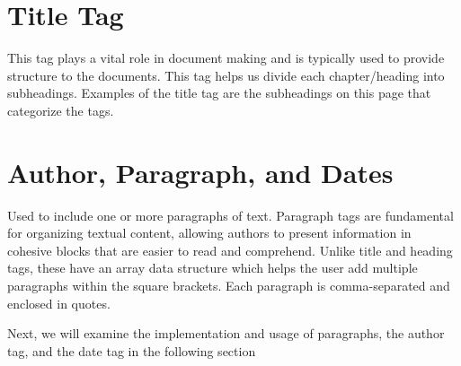 \documentclass[oneside]{book}
\begin{document}
\section{Title Tag}
This tag plays a vital role in document making and is typically used to provide structure to the documents. This tag helps us divide each chapter/heading into subheadings.
        Examples of the title tag are the subheadings on this page that categorize the tags.\par
\section{Author, Paragraph, and Dates}
Used to include one or more paragraphs of text. Paragraph tags are fundamental for organizing textual content, allowing authors to present
        information in cohesive blocks that are easier to read and comprehend. Unlike title and heading tags, these have an array data structure which helps the user add multiple 
        paragraphs within the square brackets. Each paragraph is comma-separated and enclosed in quotes.\par
Next, we will examine the implementation and usage of paragraphs, the author tag, and the date tag in the following section\par

\newpage
\end{document}
